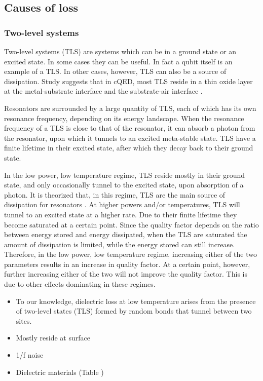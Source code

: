 \documentclass[12pt]{report}
\begin{document}
\subsection{Causes of loss}

\subsubsection{Two-level systems}
\label{sec:TLS}

Two-level systems (TLS) are systems which can be in a ground state or an excited state. In some cases they can be useful. In fact a qubit itself is an example of a TLS. In other cases, however, TLS can also be a source of dissipation. Study suggests that in cQED, most TLS reside in a thin oxide layer at the metal-substrate interface and the substrate-air interface \cite{wenner2011surface}.

Resonators are surrounded by a large quantity of TLS, each of which has its own resonance frequency, depending on its energy landscape. When the resonance frequency of a TLS is close to that of the resonator, it can absorb a photon from the resonator, upon which it tunnels to an excited meta-stable state. TLS have a finite lifetime in their excited state, after which they decay back to their ground state.

In the low power, low temperature regime, TLS reside mostly in their ground state, and only occasionally tunnel to the excited state, upon absorption of a photon. It is theorized that, in this regime, TLS are the main source of dissipation for resonators \cite{gao2008experimental}. At higher powers and/or temperatures, TLS will tunnel to an excited state at a higher rate. Due to their finite lifetime they become saturated at a certain point. Since the quality factor depends on the ratio between energy stored and energy dissipated, when the TLS are saturated the amount of dissipation is limited, while the energy stored can still increase. Therefore, in the low power, low temperature regime, increasing either of the two parameters results in an increase in quality factor. At a certain point, however, further increasing either of the two will not improve the quality factor. This is due to other effects dominating in these regimes.

\begin{itemize}
    \item To our knowledge, dielectric loss at low temperature
        arises from the presence of two-level states (TLS) formed
        by random bonds that tunnel between two sites. \cite{martinis2014ucsb}
    \item Mostly reside at surface \cite{gao2008experimental}
    \item 1/f noise \cite{burnett2013evidence}
    \item Dielectric materials (Table \cite{martinis2014ucsb})
\end{itemize}
\end{document}

